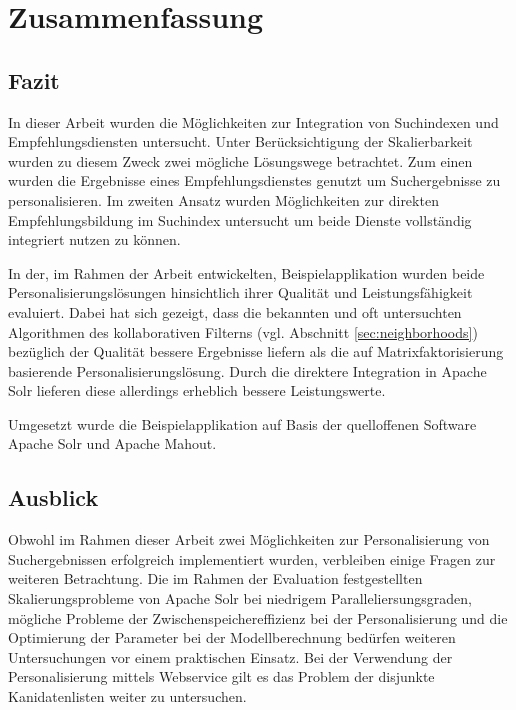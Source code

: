
\section{Zusammenfassung}\label{sec:results}


\subsection{Fazit}

In dieser Arbeit wurden die Möglichkeiten zur Integration von Suchindexen und Empfehlungsdiensten untersucht. Unter Berücksichtigung der Skalierbarkeit wurden zu diesem Zweck zwei mögliche Lösungswege betrachtet. Zum einen wurden die Ergebnisse eines Empfehlungsdienstes genutzt um Suchergebnisse zu personalisieren. Im zweiten Ansatz wurden Möglichkeiten zur direkten Empfehlungsbildung im Suchindex untersucht um beide Dienste vollständig integriert nutzen zu können.

In der, im Rahmen der Arbeit entwickelten, Beispielapplikation wurden beide Personalisierungslösungen hinsichtlich ihrer Qualität und Leistungsfähigkeit evaluiert. Dabei hat sich gezeigt, dass die bekannten und oft untersuchten Algorithmen des kollaborativen Filterns (vgl. Abschnitt \ref{sec:neighborhoods}) bezüglich der Qualität bessere Ergebnisse liefern als die auf Matrixfaktorisierung basierende Personalisierungslösung. Durch die direktere Integration in Apache Solr lieferen diese allerdings erheblich bessere Leistungswerte.

Umgesetzt wurde die Beispielapplikation auf Basis der quelloffenen Software Apache Solr und Apache Mahout. 
\newpage
\subsection{Ausblick}

Obwohl im Rahmen dieser Arbeit zwei Möglichkeiten zur Personalisierung von Suchergebnissen erfolgreich implementiert wurden, verbleiben einige Fragen zur weiteren Betrachtung. Die im Rahmen der Evaluation festgestellten Skalierungsprobleme von Apache Solr bei niedrigem Paralleliersungsgraden, mögliche Probleme der Zwischenspeichereffizienz bei der Personalisierung und die Optimierung der Parameter bei der Modellberechnung bedürfen weiteren Untersuchungen vor einem praktischen Einsatz. Bei der Verwendung der Personalisierung mittels Webservice gilt es das Problem der disjunkte Kanidatenlisten weiter zu untersuchen.


